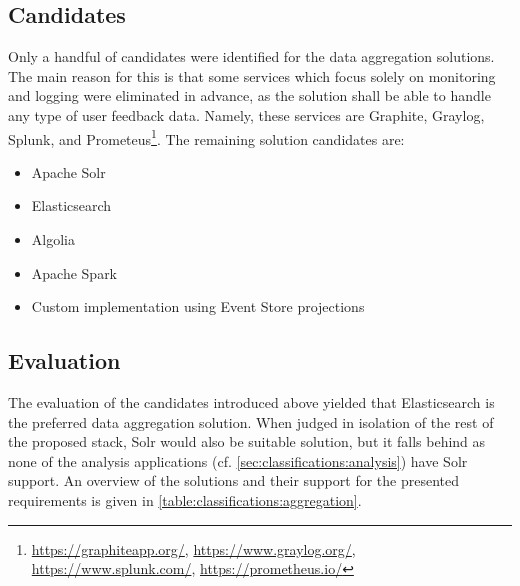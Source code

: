 \subsection{Candidates}

Only a handful of candidates were identified for the data aggregation solutions.
The main reason for this is that some services which focus solely on monitoring and logging were eliminated in advance, as the solution shall be able to handle any type of user feedback data.
Namely, these services are Graphite, Graylog, Splunk, and Prometeus\footnote{\url{https://graphiteapp.org/}, \url{https://www.graylog.org/}, \url{https://www.splunk.com/}, \url{https://prometheus.io/}}.
The remaining solution candidates are:

\begin{itemize}[noitemsep]
\item Apache Solr
\item Elasticsearch
\item Algolia
\item Apache Spark
\item Custom implementation using Event Store projections
\end{itemize}


\subsection{Evaluation}

The evaluation of the candidates introduced above yielded that Elasticsearch is the preferred data aggregation solution.
When judged in isolation of the rest of the proposed stack, Solr would also be suitable solution, but it falls behind as none of the analysis applications (cf. \cref{sec:classifications:analysis}) have Solr support.
An overview of the solutions and their support for the presented requirements is given in \cref{table:classifications:aggregation}.

